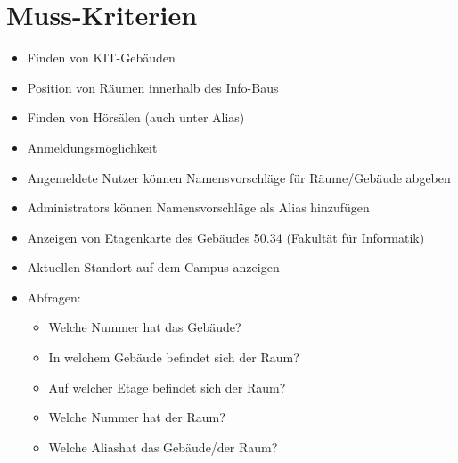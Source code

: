 \section{Muss-Kriterien}

\begin{itemize}

    \item Finden von KIT-Gebäuden
    \item Position von Räumen innerhalb des Info-Baus
    \item Finden von Hörsälen (auch unter Alias)
    \item Anmeldungsmöglichkeit
    \item Angemeldete Nutzer können Namensvorschläge für Räume/Gebäude abgeben
    \item \Glspl{Administrator} können Namensvorschläge als \Gls{Alias} hinzufügen
    \item Anzeigen von \Gls{Etagenkarte} des Gebäudes 50.34 (Fakultät für Informatik)
    \item Aktuellen Standort auf dem \Gls{Campus} anzeigen
    \item Abfragen:
        \begin{itemize}
            \item Welche Nummer hat das Gebäude?
            \item In welchem Gebäude befindet sich der Raum?
            \item Auf welcher Etage befindet sich der Raum?
            \item Welche Nummer hat der Raum?
            \item Welche \Gls{Alias}hat das Gebäude/der Raum?
        \end{itemize}

\end{itemize}
